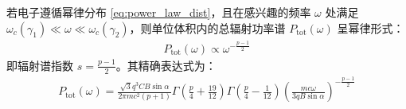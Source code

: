 \begin{theorem}[集体辐射的功率谱]
    若电子遵循幂律分布 \eqref{eq:power_law_dist}，且在感兴趣的频率 $\omega$ 处满足 $\omega_c(\gamma_1) \ll \omega \ll \omega_c(\gamma_2)$，则单位体积内的总辐射功率谱 $P_{\text{tot}}(\omega)$ 呈幂律形式：
    \begin{align}
        P_{\text{tot}}(\omega) \propto \omega^{-\frac{p-1}{2}}
    \end{align}
    即辐射谱指数 $s = \frac{p-1}{2}$。其精确表达式为：
    \begin{align}
        P_{\text{tot}}(\omega) = \frac{\sqrt{3} q^3 C B \sin\alpha}{2\pi m c^2 (p+1)} \Gamma\left(\frac{p}{4} + \frac{19}{12}\right) \Gamma\left(\frac{p}{4} - \frac{1}{12}\right) \left( \frac{m c \omega}{3 q B \sin\alpha} \right)^{-\frac{p-1}{2}}
    \end{align}
\end{theorem}

